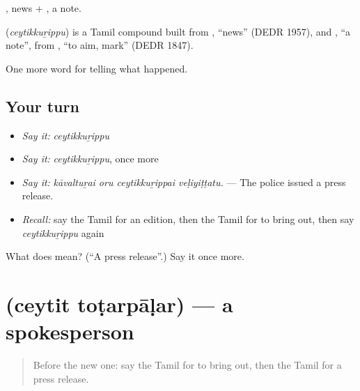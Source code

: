 , news + , a note.

\begin{cousinweb}
\textbf{} (\emph{ceytikkuṟippu}) is a Tamil compound built from , \textquotedblleft{}news\textquotedblright{} (DEDR 1957), and , \textquotedblleft{}a note\textquotedblright{}, from , \textquotedblleft{}to aim, mark\textquotedblright{} (DEDR 1847).
\end{cousinweb}

\begin{grammarlens}[title={What you've built}]
One more word for telling what happened.
\end{grammarlens}

\subsection*{Your turn}
\begin{itemize}
\raggedright
  \item \emph{Say it:} \emph{ceytikkuṟippu}
  \item \emph{Say it:} \emph{ceytikkuṟippu}, once more
  \item \emph{Say it:} \emph{kāvaltuṟai oru ceytikkuṟippai veḷiyiṭṭatu.} — The police issued a press release.
  \item \emph{Recall:} say the Tamil for an edition, then the Tamil for to bring out, then say \emph{ceytikkuṟippu} again
\end{itemize}

\begin{tcolorbox}[breakable,colback=teal!4,colframe=teal!35!black,title={Before you move on}]
What does  mean? (\textquotedblleft{}A press release\textquotedblright{}.) Say it once more.
\end{tcolorbox}
\section[\texorpdfstring{\ta{செய்தித்} \ta{தொடர்பாளர்} (ceytit toṭarpāḷar)}{செய்தித் தொடர்பாளர் (ceytit toṭarpāḷar)}]{  (ceytit toṭarpāḷar) — a spokesperson}

\label{lesson:TA-C307-ceytit-totarpalar}



\begin{quote}
Before the new one: say the Tamil for to bring out, then the Tamil for a press release.
\end{quote}

